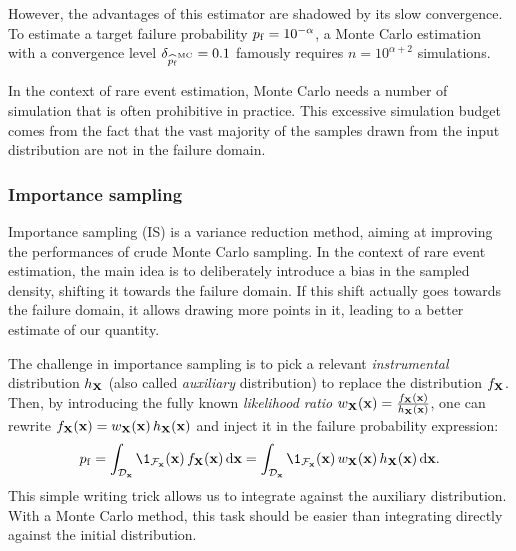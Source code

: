 However, the advantages of this estimator are shadowed by its slow convergence. 
To estimate a target failure probability $p_\mathrm{f}=10^{-\alpha}$, 
a Monte Carlo estimation with a convergence level $\delta_{\widehat{p_\mathrm{f}}^{\textrm{MC}}} = 0.1$ famously requires $n=10^{\alpha + 2}$ simulations. 

In the context of rare event estimation, Monte Carlo needs a number of simulation that is often prohibitive in practice. 
This excessive simulation budget comes from the fact that the vast majority of the samples drawn from the input distribution are not in the failure domain.


\subsubsection{Importance sampling}

Importance sampling (IS) is a variance reduction method, aiming at improving the performances of crude Monte Carlo sampling. 
In the context of rare event estimation, the main idea is to deliberately introduce a bias in the sampled density, shifting it towards the failure domain. 
If this shift actually goes towards the failure domain, it allows drawing more points in it, leading to a better estimate of our quantity.

The challenge in importance sampling is to pick a relevant \textit{instrumental} distribution $h_{\bf X}$ (also called \textit{auxiliary} distribution) to replace the distribution $f_{\bf X}$. 
Then, by introducing the fully known \textit{likelihood ratio} $w_{\bf X}({\bf x}) = \frac{f_{\bf X}({\bf x})}{h_{\bf X}({\bf x})}$, one can rewrite $f_{\bf X}({\bf x}) = w_{\bf X}({\bf x}) \, h_{\bf X}({\bf x})$ and inject it in the failure probability expression: 
\begin{equation}
    \pf = \int_{\iD_\bx} \1_{\iF_\bx}(\bx) \, f_\bX(\bx) \, \dd\bx
        = \int_{\iD_\bx} \1_{\iF_\bx}(\bx) \, w_\bX(\bx) \, h_\bX(\bx) \, \dd\bx.
\end{equation}
This simple writing trick allows us to integrate against the auxiliary distribution. 
With a Monte Carlo method, this task should be easier than integrating directly against the initial distribution.

